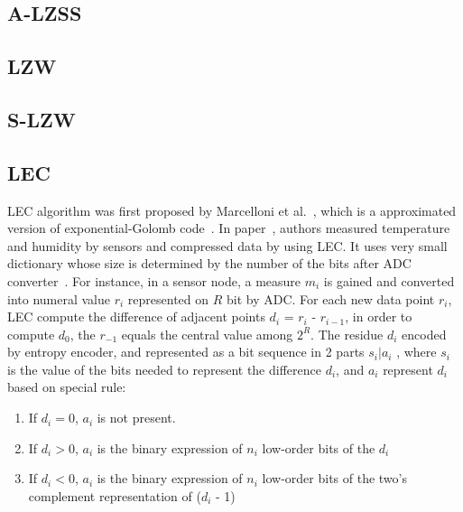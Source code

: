 
\subsection{A-LZSS}

\subsection{LZW}
\subsection{S-LZW}

\subsection{LEC}
LEC algorithm was first proposed by Marcelloni et
al.~\cite{marcelloni2008simple}, which is a approximated version of
exponential-Golomb code~\cite{teuhola1978compression}. In
paper~\cite{marcelloni2008simple}, authors measured temperature and humidity by
sensors and compressed data by using LEC. It uses very small dictionary whose
size is determined by the number of the bits after ADC
converter~\cite{marcelloni2008simple,marcelloni2009efficient}.  For instance, in
a sensor node, a measure $m_i$ is gained and converted into numeral value $r_i$
represented on $R$ bit by ADC. For each new data point $r_i$, LEC compute the
difference of adjacent points $d_i$ = $r_i$ - $r_{i-1}$, in order to compute
$d_0$, the $r_{-1}$ equals the central value among $2^R$. The residue $d_i$
encoded by entropy encoder, and represented as a bit sequence in 2 parts $s_i |
a_i$ , where $s_i$ is the value of the bits needed to represent the difference
$d_i$, and $a_i$ represent $d_i$ based on special rule:
\begin{enumerate}
    \item If $d_i = 0$, $a_i$ is not present.    
    \item If $d_i > 0$, $a_i$ is the binary expression of $n_i$ low-order bits
    of the $d_i$
    \item If $d_i < 0$, $a_i$ is the binary expression of $n_i$ low-order bits
    of the two's complement representation of ($d_i$ - 1)
\end{enumerate}

